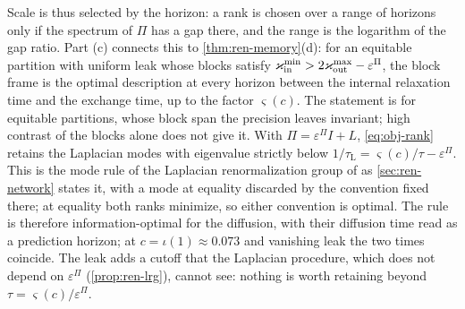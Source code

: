 Scale is thus selected by the horizon: a rank is chosen over a range of horizons only if the spectrum of $\Pi$ has a gap there, and the range is the logarithm of the gap ratio. Part (c) connects this to \cref{thm:ren-memory}(d): for an equitable partition with uniform leak whose blocks satisfy $\varkappa_{\mathrm{in}}^{\min}>2\varkappa_{\mathrm{out}}^{\max}-\varepsilon^\Pi$, the block frame is the optimal description at every horizon between the internal relaxation time and the exchange time, up to the factor $\varsigma(c)$. The statement is for equitable partitions, whose block span the precision leaves invariant; high contrast of the blocks alone does not give it. With $\Pi=\varepsilon^\Pi I+L$, \eqref{eq:obj-rank} retains the Laplacian modes with eigenvalue strictly below $1/\tau_{\mathrm L}=\varsigma(c)/\tau-\varepsilon^\Pi$. This is the mode rule of the Laplacian renormalization group of \citet{villegas2023laplacian} as \cref{sec:ren-network} states it, with a mode at equality discarded by the convention fixed there; at equality both ranks minimize, so either convention is optimal. The rule is therefore information-optimal for the diffusion, with their diffusion time read as a prediction horizon; at $c=\iota(1)\approx0.073$ and vanishing leak the two times coincide. The leak adds a cutoff that the Laplacian procedure, which does not depend on $\varepsilon^\Pi$ (\cref{prop:ren-lrg}), cannot see: nothing is worth retaining beyond $\tau=\varsigma(c)/\varepsilon^\Pi$.

